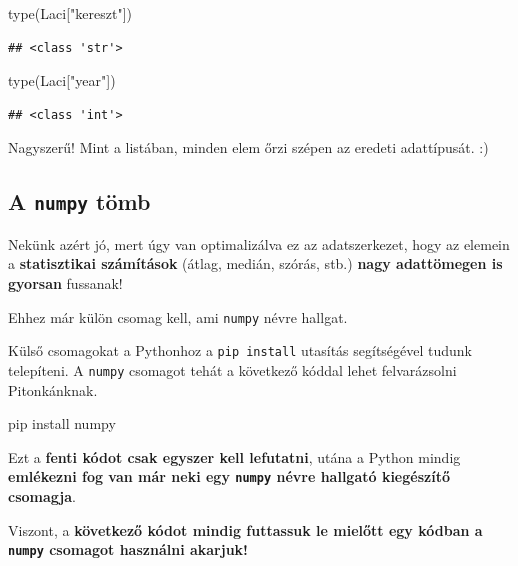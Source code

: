\documentclass[
]{book}
\newenvironment{Shaded}{\begin{snugshade}}{\end{snugshade}}
\newcommand{\BuiltInTok}[1]{#1}
\newcommand{\NormalTok}[1]{#1}
\newcommand{\StringTok}[1]{\textcolor[rgb]{0.31,0.60,0.02}{#1}}
\begin{document}
\begin{Shaded}
\begin{Highlighting}[]
\BuiltInTok{type}\NormalTok{(Laci[}\StringTok{"kereszt"}\NormalTok{])}
\end{Highlighting}
\end{Shaded}

\begin{verbatim}
## <class 'str'>
\end{verbatim}

\begin{Shaded}
\begin{Highlighting}[]
\BuiltInTok{type}\NormalTok{(Laci[}\StringTok{"year"}\NormalTok{])}
\end{Highlighting}
\end{Shaded}

\begin{verbatim}
## <class 'int'>
\end{verbatim}

Nagyszerű! Mint a listában, minden elem őrzi szépen az eredeti adattípusát. :)

\subsection{\texorpdfstring{A \texttt{numpy} tömb}{A numpy tömb}}\label{a-numpy-tuxf6mb}

Nekünk azért jó, mert úgy van optimalizálva ez az adatszerkezet, hogy az elemein a \textbf{statisztikai számítások} (átlag, medián, szórás, stb.) \textbf{nagy adattömegen is gyorsan} fussanak!

Ehhez már külön csomag kell, ami \texttt{numpy} névre hallgat.

Külső csomagokat a Pythonhoz a \texttt{pip\ install} utasítás segítségével tudunk telepíteni. A \texttt{numpy} csomagot tehát a következő kóddal lehet felvarázsolni Pitonkánknak.

\begin{Shaded}
\begin{Highlighting}[]
\NormalTok{pip install numpy}
\end{Highlighting}
\end{Shaded}

Ezt a \textbf{fenti kódot csak egyszer kell lefutatni}, utána a Python mindig \textbf{emlékezni fog van már neki egy \texttt{numpy} névre hallgató kiegészítő csomagja}.

Viszont, a \textbf{következő kódot mindig futtassuk le mielőtt egy kódban a \texttt{numpy} csomagot használni akarjuk!}
\end{document}
